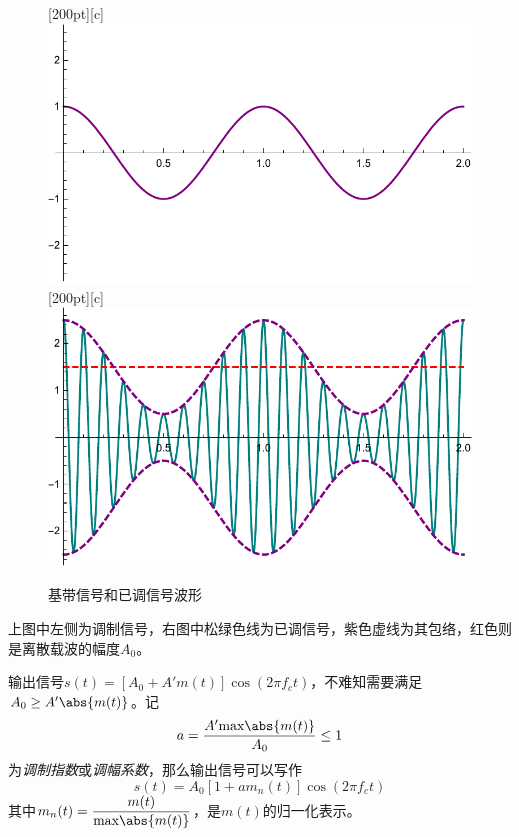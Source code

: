     \begin{figure}[H]
        \centering
        [200pt][c]{\includegraphics[scale=0.5]{body/image/book426AMmt.pdf}}
        [200pt][c]{\includegraphics[scale=0.5]{body/image/book426AMst.pdf}}
        \caption{基带信号和已调信号波形}
    \end{figure}

    上图中左侧为调制信号，右图中松绿色线为已调信号，紫色虚线为其包络，红色则是离散载波的幅度$A_0$。
    
    输出信号$s(t)=[A_0+A'm(t)]\cos(2\pi f_ct)$，不难知需要满足$A_0\geq A'\abs{m(t)}$。记
    \begin{equation}
        a=\frac{A'\text{max}\abs{m(t)}}{A_0}\leq 1
    \end{equation}
    为\emph{调制指数}或\emph{调幅系数}，那么输出信号可以写作
    \begin{equation}
        s(t)=A_0[1+am_n(t)]\cos(2\pi f_ct)
    \end{equation}
    其中$m_n(t)=\dfrac{m(t)}{\text{max}\abs{m(t)}}$，是$m(t)$的归一化表示。

